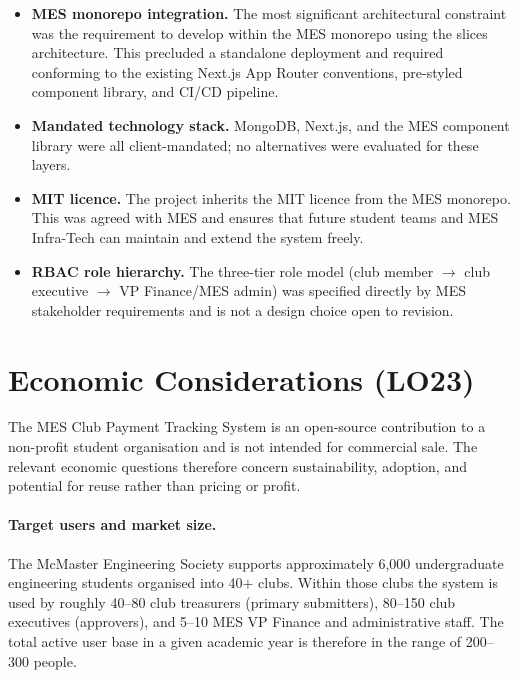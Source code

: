 \documentclass{article}
\begin{document}
\begin{itemize}
  \item \textbf{MES monorepo integration.}  The most significant
    architectural constraint was the requirement to develop within the MES
    monorepo using the slices architecture.  This precluded a standalone
    deployment and required conforming to the existing Next.js App Router
    conventions, pre-styled component library, and CI/CD pipeline.
  \item \textbf{Mandated technology stack.}  MongoDB, Next.js, and the
    MES component library were all client-mandated; no alternatives were
    evaluated for these layers.
  \item \textbf{MIT licence.}  The project inherits the MIT licence from
    the MES monorepo.  This was agreed with MES and ensures that future
    student teams and MES Infra-Tech can maintain and extend the system
    freely.
  \item \textbf{RBAC role hierarchy.}  The three-tier role model (club
    member $\rightarrow$ club executive $\rightarrow$ VP Finance/MES admin)
    was specified directly by MES stakeholder requirements and is not a
    design choice open to revision.
\end{itemize}

\section{Economic Considerations (LO23)}

The MES Club Payment Tracking System is an open-source contribution to a
non-profit student organisation and is not intended for commercial sale.
The relevant economic questions therefore concern sustainability, adoption,
and potential for reuse rather than pricing or profit.

\paragraph{Target users and market size.}
The McMaster Engineering Society supports approximately 6,000 undergraduate
engineering students organised into 40$+$ clubs.  Within those clubs the
system is used by roughly 40--80 club treasurers (primary submitters),
80--150 club executives (approvers), and 5--10 MES VP Finance and
administrative staff.  The total active user base in a given academic year
is therefore in the range of 200--300 people.
\end{document}
